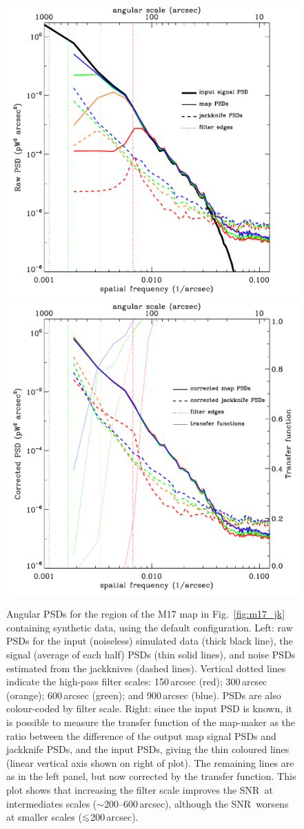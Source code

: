 \documentclass[useAMS,usenatbib,nofootinbib]{mn2e}
\newcommand{\snr}{SNR}
\def\lsim{\mathrel{\lower2.5pt\vbox{\lineskip=0pt\baselineskip=0pt
          \hbox{$<$}\hbox{$\sim$}}}}
\begin{document}
\begin{figure}
\centering
\includegraphics[width=0.49\linewidth]{pspec_m17_default.pdf}
\includegraphics[width=0.49\linewidth]{cor_pspec_m17_default.pdf}
\caption{Angular PSDs for the region of the M17 map in
Fig.~\ref{fig:m17_jk} containing synthetic data, using the default
configuration. Left: raw PSDs for the input (noiseless) simulated data
(thick black line), the signal (average of each half) PSDs (thin solid
lines), and noise PSDs estimated from the jackknives (dashed
lines). Vertical dotted lines indicate the high-pass filter scales:
150\,arcsec (red); 300\,arcsec (orange); 600\,arcsec (green); and
900\,arcsec (blue). PSDs are also colour-coded by filter scale. Right:
since the input PSD is known, it is possible to measure the transfer
function of the map-maker as the ratio between the difference of the
output map signal PSDs and jackknife PSDs, and the input PSDs, giving
the thin coloured lines (linear vertical axis shown on right of
plot). The remaining lines are as in the left panel, but now corrected
by the transfer function. This plot shows that increasing the filter
scale improves the \snr\ at intermediates scales
($\sim$200--600\,arcsec), although the \snr\ worsens at smaller scales
($\lsim$200\,arcsec).}
\label{fig:m17_def_ps}
\end{figure}
\end{document}
